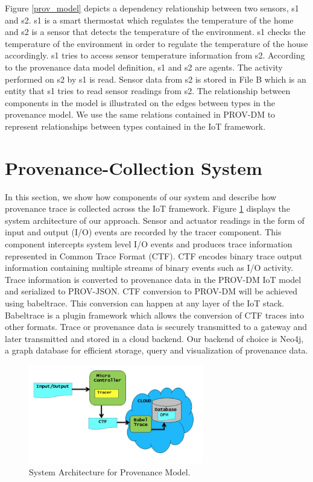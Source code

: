 Figure \ref{prov_model}  depicts a dependency relationship between two sensors, s1 and s2. s1 is a smart thermostat which regulates the temperature of the home and s2 is a sensor that detects the temperature of the environment. s1 checks the temperature of the environment in order to regulate the temperature of the house accordingly. s1 tries to access sensor temperature information from s2. According to the provenance data model  definition, s1 and s2 are agents. The activity performed on s2 by s1 is read. Sensor data from s2 is stored in File B which is  an entity that s1 tries to read sensor readings from s2. The relationship between components in the model is illustrated on the edges between types in the provenance model. We use the same relations contained in PROV-DM to represent relationships between types contained in the IoT framework.




\section{Provenance-Collection System}

In this section, we show how components of our system and describe how provenance trace is collected across the IoT framework. Figure \ref{architecture} displays the system architecture of our approach. Sensor and actuator readings in the form of input and output (I/O) events are recorded by the tracer component. This component intercepts system level I/O events and produces trace information represented in Common Trace Format (CTF). CTF encodes binary trace output information containing multiple streams of binary events such as I/O activity. Trace information is converted to provenance data in the PROV-DM IoT model and serialized to PROV-JSON. CTF conversion to PROV-DM will be achieved using babeltrace. This conversion can happen at any layer of the IoT stack. Babeltrace is a plugin framework which allows the conversion of CTF traces into other formats. Trace or provenance data is securely transmitted to a gateway and later transmitted and stored in a cloud backend. Our backend of choice is Neo4j, a graph database for efficient storage, query and visualization of provenance data.


\begin{figure}[b]
\begin{center}

\includegraphics[width =3.0in]{architecture.PNG}    
\end{center}
\caption{System Architecture for Provenance Model.}
\label{architecture}
\end{figure}

